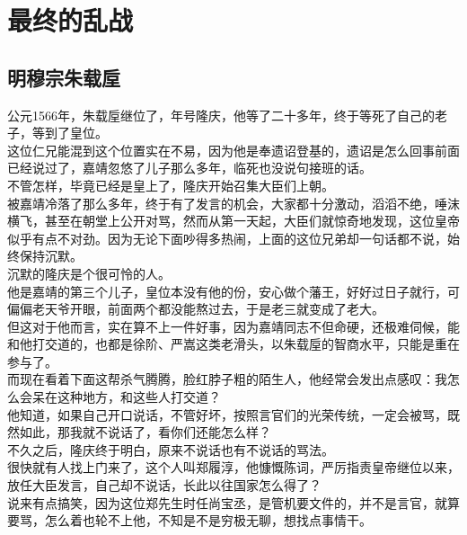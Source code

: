 \section{最终的乱战}
\ifnum{}
	\begin{multicols}{\theparacolNo}
\fi
\subsection{明穆宗朱载垕}
公元1566年，朱载垕继位了，年号隆庆，他等了二十多年，终于等死了自己的老子，等到了皇位。\\

这位仁兄能混到这个位置实在不易，因为他是奉遗诏登基的，遗诏是怎么回事前面已经说过了，嘉靖忽悠了儿子那么多年，临死也没说句接班的话。\\

不管怎样，毕竟已经是皇上了，隆庆开始召集大臣们上朝。\\

被嘉靖冷落了那么多年，终于有了发言的机会，大家都十分激动，滔滔不绝，唾沫横飞，甚至在朝堂上公开对骂，然而从第一天起，大臣们就惊奇地发现，这位皇帝似乎有点不对劲。因为无论下面吵得多热闹，上面的这位兄弟却一句话都不说，始终保持沉默。\\

沉默的隆庆是个很可怜的人。\\

他是嘉靖的第三个儿子，皇位本没有他的份，安心做个藩王，好好过日子就行，可偏偏老天爷开眼，前面两个都没能熬过去，于是老三就变成了老大。\\

但这对于他而言，实在算不上一件好事，因为嘉靖同志不但命硬，还极难伺候，能和他打交道的，也都是徐阶、严嵩这类老滑头，以朱载垕的智商水平，只能是重在参与了。\\

而现在看着下面这帮杀气腾腾，脸红脖子粗的陌生人，他经常会发出点感叹：我怎么会呆在这种地方，和这些人打交道？\\

他知道，如果自己开口说话，不管好坏，按照言官们的光荣传统，一定会被骂，既然如此，那我就不说话了，看你们还能怎么样？\\

不久之后，隆庆终于明白，原来不说话也有不说话的骂法。\\

很快就有人找上门来了，这个人叫郑履淳，他慷慨陈词，严厉指责皇帝继位以来，放任大臣发言，自己却不说话，长此以往国家怎么得了？\\

说来有点搞笑，因为这位郑先生时任尚宝丞，是管机要文件的，并不是言官，就算要骂，怎么着也轮不上他，不知是不是穷极无聊，想找点事情干。\\


\end{multicols}
